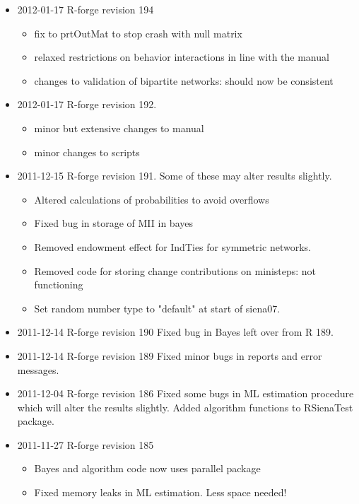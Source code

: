 \documentclass[a4paper,fleqn,11pt]{article}
\newcommand{\+}{\, + \,}
\begin{document}
{\begin{small}
\begin{itemize}
\begin{itemize}
\item New maintainers address: rsiena@stats.ox.ac.uk
\item Print method for sienaFit objects now includes values of fixed parameters,
  rather than NA.
\end{itemize}
\item 2012-01-17 R-forge revision 194
\begin{itemize}
\item fix to prtOutMat to stop crash with null matrix
\item relaxed restrictions on behavior interactions in line with the manual
\item changes to validation of bipartite networks: should now be consistent
\end{itemize}
\item 2012-01-17 R-forge revision 192.
\begin{itemize}
\item minor but extensive changes to manual
\item minor changes to scripts
\end{itemize}
\item 2011-12-15 R-forge revision 191. Some of these may alter results slightly.
\begin{itemize}
\item Altered calculations of probabilities to avoid overflows
\item Fixed bug in storage of MII in bayes
\item Removed endowment effect for IndTies for symmetric networks.
\item Removed code for storing change contributions on ministeps: not
  functioning
\item Set random number type to "default" at start of siena07.
\end{itemize}
\item 2011-12-14 R-forge revision 190
Fixed bug in Bayes left over from R 189.
\item 2011-12-14 R-forge revision 189
 Fixed minor bugs in reports and error messages.
\item 2011-12-04 R-forge revision 186
Fixed some bugs in ML estimation procedure which will alter the results
slightly. Added algorithm functions to RSienaTest package.
\item 2011-11-27 R-forge revision 185
\begin{itemize}
\item Bayes and algorithm code now uses parallel package
\item Fixed memory leaks in ML estimation. Less space needed!

\end{itemize}
\end{itemize}
\end{small}}
\end{document}
